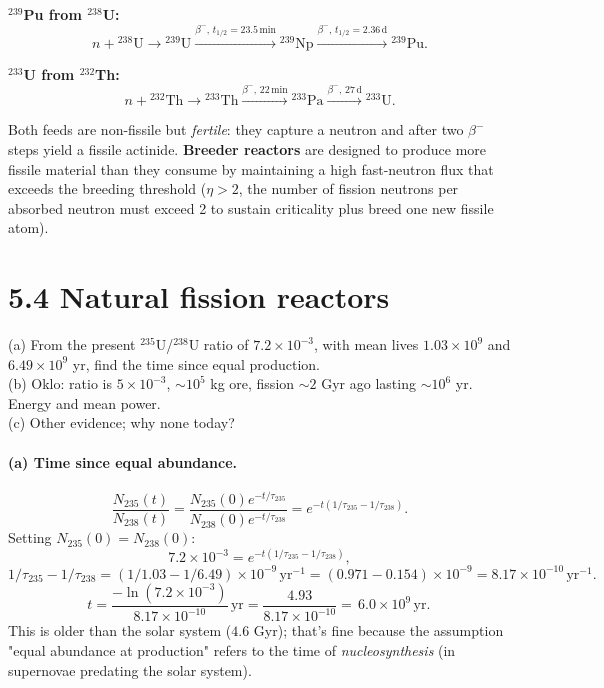 \documentclass[11pt]{article}
\newcommand{\Q}[1]{\begin{question}#1\end{question}}
\begin{document}
\textbf{$^{239}$Pu from $^{238}$U:}
\[
n+{}^{238}\mathrm{U}\to{}^{239}\mathrm{U}\xrightarrow{\beta^-,\,t_{1/2}=23.5\,\mathrm{min}}{}^{239}\mathrm{Np}\xrightarrow{\beta^-,\,t_{1/2}=2.36\,\mathrm{d}}{}^{239}\mathrm{Pu}.
\]

\textbf{$^{233}$U from $^{232}$Th:}
\[
n+{}^{232}\mathrm{Th}\to{}^{233}\mathrm{Th}\xrightarrow{\beta^-,\,22\,\mathrm{min}}{}^{233}\mathrm{Pa}\xrightarrow{\beta^-,\,27\,\mathrm{d}}{}^{233}\mathrm{U}.
\]

Both feeds are non-fissile but \emph{fertile}: they capture a neutron and after two $\beta^-$ steps yield a fissile actinide. \textbf{Breeder reactors} are designed to produce more fissile material than they consume by maintaining a high fast-neutron flux that exceeds the breeding threshold ($\eta>2$, the number of fission neutrons per absorbed neutron must exceed 2 to sustain criticality plus breed one new fissile atom).

\section*{5.4 \quad Natural fission reactors}

\Q{(a) From the present $^{235}$U/$^{238}$U ratio of $7.2\times 10^{-3}$, with mean lives $1.03\times 10^{9}$ and $6.49\times 10^{9}$ yr, find the time since equal production.\\
(b) Oklo: ratio is $5\times 10^{-3}$, $\sim 10^{5}$ kg ore, fission $\sim 2$ Gyr ago lasting $\sim 10^{6}$ yr. Energy and mean power.\\
(c) Other evidence; why none today?}

\paragraph{(a) Time since equal abundance.}
\[
\frac{N_{235}(t)}{N_{238}(t)}=\frac{N_{235}(0)e^{-t/\tau_{235}}}{N_{238}(0)e^{-t/\tau_{238}}}=e^{-t(1/\tau_{235}-1/\tau_{238})}.
\]
Setting $N_{235}(0)=N_{238}(0)$:
\[
7.2\times 10^{-3}=e^{-t(1/\tau_{235}-1/\tau_{238})},
\]
\[
1/\tau_{235}-1/\tau_{238}=(1/1.03-1/6.49)\times 10^{-9}\,\mathrm{yr^{-1}}=(0.971-0.154)\times 10^{-9}=8.17\times 10^{-10}\,\mathrm{yr^{-1}}.
\]
\[
t=\frac{-\ln(7.2\times 10^{-3})}{8.17\times 10^{-10}}\,\mathrm{yr}=\frac{4.93}{8.17\times 10^{-10}}=\boxed{\,6.0\times 10^{9}\,\mathrm{yr}.\,}
\]
This is older than the solar system ($4.6$ Gyr); that's fine because the assumption "equal abundance at production" refers to the time of \emph{nucleosynthesis} (in supernovae predating the solar system).
\end{document}
